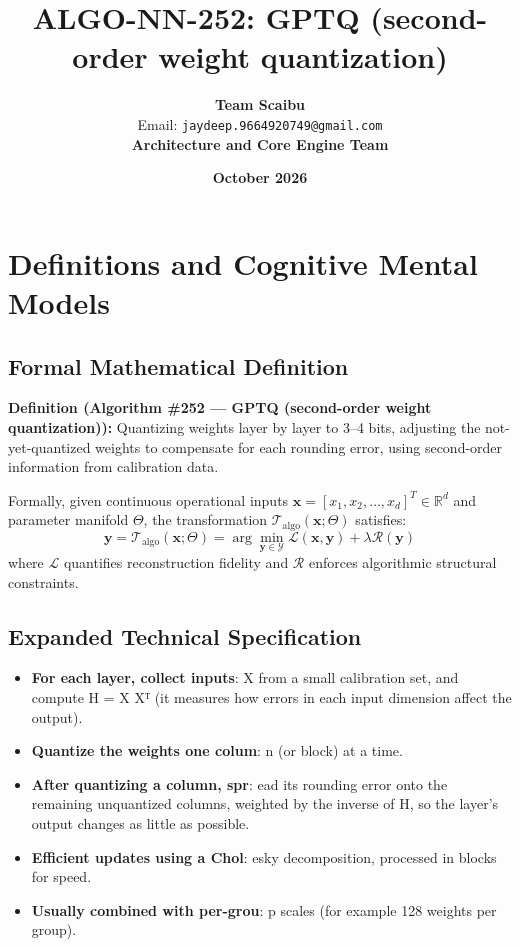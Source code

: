 \documentclass[11pt,a4paper]{article}
\title{\textbf{ALGO-NN-252: GPTQ (second-order weight quantization)}}
\author{\textbf{Team Scaibu} \\ \small Email: \texttt{jaydeep.9664920749@gmail.com} \\ \small \textbf{Architecture and Core Engine Team}}
\date{\textbf{October 2026}}
\theoremstyle{definition}
\begin{document}
\maketitle

\section{Definitions and Cognitive Mental Models}

\subsection{Formal Mathematical Definition}
\textbf{Definition (Algorithm \#252 --- GPTQ (second-order weight quantization)):}
Quantizing weights layer by layer to 3–4 bits, adjusting the not-yet-quantized weights to compensate for each rounding error, using second-order information from calibration data.

Formally, given continuous operational inputs $\mathbf{x} = [x_1, x_2, \dots, x_d]^T \in \mathbb{R}^d$ and parameter manifold $\Theta$, the transformation $\mathcal{T}_{\text{algo}}(\mathbf{x}; \Theta)$ satisfies:
{\boldmath
\begin{equation}
\mathbf{y} = \mathcal{T}_{\text{algo}}(\mathbf{x}; \Theta) = \arg\min_{\mathbf{y} \in \mathcal{Y}} \mathcal{L}(\mathbf{x}, \mathbf{y}) + \lambda \mathcal{R}(\mathbf{y})
\end{equation}
}
where $\mathcal{L}$ quantifies reconstruction fidelity and $\mathcal{R}$ enforces algorithmic structural constraints.

\subsection{Expanded Technical Specification}
\begin{itemize}
\item \textbf{For each layer, collect inputs}:  X from a small calibration set, and compute H = X Xᵀ (it measures how errors in each input dimension affect the output).
\item \textbf{Quantize the weights one colum}: n (or block) at a time.
\item \textbf{After quantizing a column, spr}: ead its rounding error onto the remaining unquantized columns, weighted by the inverse of H, so the layer's output changes as little as possible.
\item \textbf{Efficient updates using a Chol}: esky decomposition, processed in blocks for speed.
\item \textbf{Usually combined with per-grou}: p scales (for example 128 weights per group).
\end{itemize}
\end{document}
